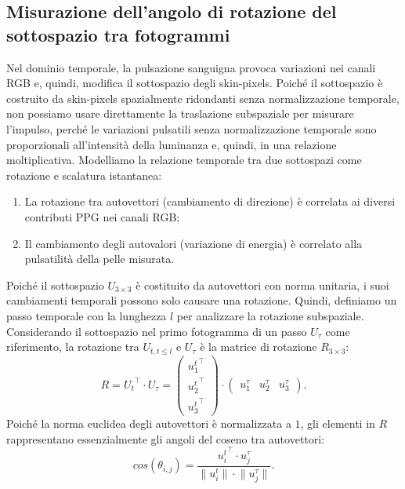 \documentclass[journal,A4paper,compsoc,epsfig]{IEEEtran}
\begin{document}
    \subsection{Misurazione dell'angolo di rotazione del sottospazio tra fotogrammi}
      Nel dominio temporale, la pulsazione sanguigna provoca variazioni nei canali RGB e, quindi, modifica il sottospazio degli skin-pixels.
      Poiché il sottospazio è costruito da skin-pixels spazialmente ridondanti senza normalizzazione temporale, non possiamo usare direttamente la traslazione subspaziale per misurare l'impulso,
      perché le variazioni pulsatili senza normalizzazione temporale sono proporzionali all'intensità della luminanza e, quindi, in una relazione moltiplicativa.
      Modelliamo la relazione temporale tra due sottospazi come rotazione e scalatura istantanea:
      \begin{enumerate}
        \item La rotazione tra autovettori (cambiamento di direzione) è correlata ai diversi contributi PPG nei canali RGB;
        \item Il cambiamento degli autovalori (variazione di energia) è correlato alla pulsatilità della pelle misurata.
      \end{enumerate}
      Poiché il sottospazio $U_{3 \times 3}$ è costituito da autovettori con norma unitaria, i suoi cambiamenti temporali possono solo causare una rotazione.
      Quindi, definiamo un passo temporale con la lunghezza $l$ per analizzare la rotazione subspaziale.
      Considerando il sottospazio nel primo fotogramma di un passo $U_{\tau}$ come riferimento, la rotazione tra $U_{t, t \leq l}$ e $U_{\tau}$ è la matrice di rotazione $R_{3 \times 3}$:
      \begin{equation}
        R = {U_t}^{\top} \cdot U_{\tau} =
        \begin{pmatrix}
          {u^t_1}^{\top} \\
          {u^t_2}^{\top} \\
          {u^t_3}^{\top}
        \end{pmatrix} \cdot
        \begin{pmatrix}
          u^{\tau}_1 &
          u^{\tau}_2 &
          u^{\tau}_3
        \end{pmatrix}.
        \label{eq:RotationMatrix}
      \end{equation}
      Poiché la norma euclidea degli autovettori è normalizzata a $1$, gli elementi in $R$ rappresentano essenzialmente gli angoli del coseno tra autovettori:
      \begin{equation}
        cos(\theta_{i, j}) = \frac{{u^t_i}^{\top} \cdot u^{\tau}_j}{\lVert u^t_i \rVert \cdot \lVert u^{\tau}_j \rVert}.
        \label{eq:CosNorm}
      \end{equation}
\end{document}
